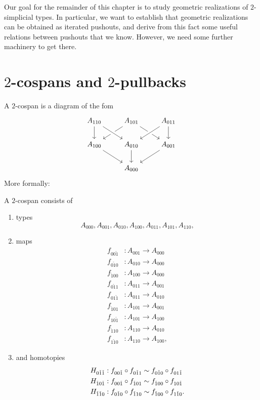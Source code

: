 Our goal for the remainder of this chapter is to study geometric realizations of $2$-simplicial types. In particular, we want to establish that geometric realizations can be obtained as iterated pushouts, and derive from this fact some useful relations between pushouts that we know. However, we need some further machinery to get there.

\section{$2$-cospans and $2$-pullbacks}

A $2$-cospan is a diagram of the fom
\begin{equation*}
\begin{tikzcd}
A_{110} \arrow[d] & A_{101} \arrow[dl] \arrow[dr] & A_{011} \arrow[d] \\
A_{100} \arrow[dr] & A_{010} \arrow[d] \arrow[from=ul,crossing over] \arrow[from=ur,crossing over] & A_{001} \arrow[dl] \\
& A_{000}
\end{tikzcd}
\end{equation*}
More formally:

\begin{defn}
A $2$-cospan consists of 
\begin{enumerate}
\item types
\begin{equation*}
A_{000},A_{001},A_{010},A_{100},A_{011},A_{101},A_{110},
\end{equation*}
\item maps
\begin{align*}
f_{00\check{1}} & : A_{001}\to A_{000} \\
f_{0\check{1}0} & : A_{010}\to A_{000} \\
f_{\check{1}00} & : A_{100}\to A_{000} \\
f_{0\check{1}1} & : A_{011}\to A_{001} \\
f_{01\check{1}} & : A_{011}\to A_{010} \\
f_{\check{1}01} & : A_{101}\to A_{001} \\
f_{10\check{1}} & : A_{101}\to A_{100} \\
f_{\check{1}10} & : A_{110}\to A_{010} \\
f_{1\check{1}0} & : A_{110}\to A_{100},
\end{align*}
\item and homotopies
\begin{align*}
H_{0\check{1}\check{1}} & : f_{00\check{1}}\circ f_{0\check{1}1} \sim f_{0\check{1}0}\circ f_{01\check{1}} \\
H_{\check{1}0\check{1}} & : f_{00\check{1}}\circ f_{\check{1}01} \sim f_{\check{1}00}\circ f_{10\check{1}} \\
H_{\check{1}\check{1}0} & : f_{0\check{1}0}\circ f_{\check{1}10} \sim f_{\check{1}00}\circ f_{1\check{1}0}.
\end{align*}
\end{enumerate}
\end{defn}

